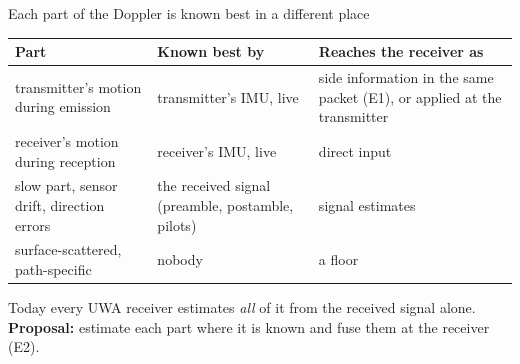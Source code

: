 \documentclass[aspectratio=169,11pt]{beamer}
\begin{document}
\begin{frame}{Each part of the Doppler is known best in a different place}
\scriptsize\setlength{\tabcolsep}{4pt}\renewcommand{\arraystretch}{1.1}
\begin{tabular}{@{}L{0.30\textwidth}L{0.36\textwidth}L{0.28\textwidth}@{}}
\toprule
\textbf{Part} & \textbf{Known best by} & \textbf{Reaches the receiver as}\\
\midrule
transmitter's motion during emission & transmitter's IMU, live & \alert{side information in the same packet} (E1), or applied at the transmitter\\
receiver's motion during reception & receiver's IMU, live & direct input\\
slow part, sensor drift, direction errors & the received signal (preamble, postamble, pilots) & signal estimates\\
surface-scattered, path-specific & nobody & a floor\\
\bottomrule
\end{tabular}

\medskip
\small Today every UWA receiver estimates \emph{all} of it from the received signal alone. \textbf{Proposal:} estimate each part where it is known and \alert{fuse} them at the receiver (E2).
\end{frame}
\end{document}
